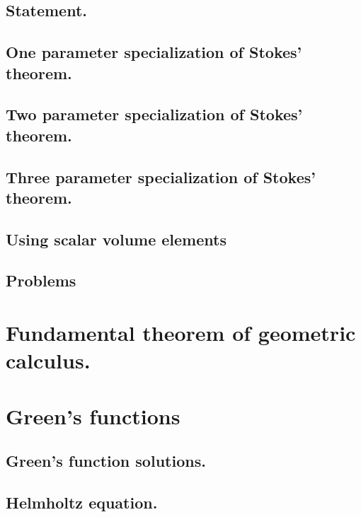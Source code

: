       \subsection{Statement.}
         
      \subsection{One parameter specialization of Stokes' theorem.}
         
      \subsection{Two parameter specialization of Stokes' theorem.}
         
      \subsection{Three parameter specialization of Stokes' theorem.}
         
      \subsection{Using scalar volume elements}
         
      \subsection{Problems}
         
         

   \section{Fundamental theorem of geometric calculus.}
      
   \section{Green's functions}
      
      \subsection{Green's function solutions.}
         
      \subsection{Helmholtz equation.}
         
